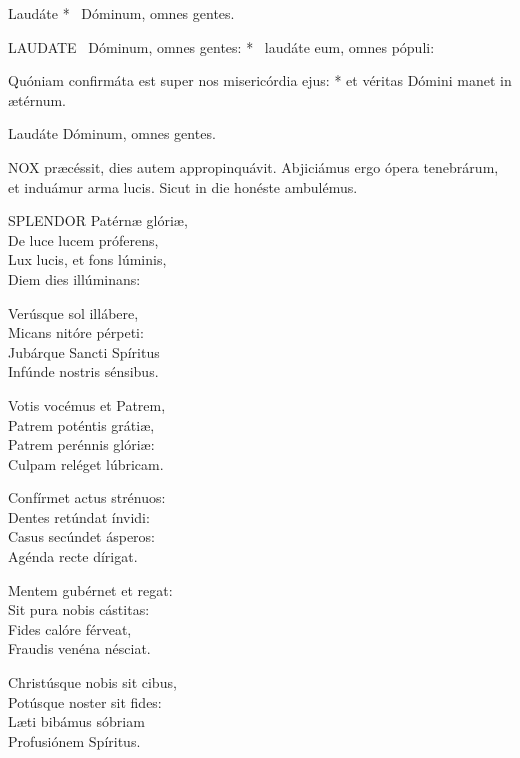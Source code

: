  Laudáte * \textdagger\ Dóminum, omnes gentes. \textdaggerdbl


\lettrine[lines=2]{L}{AUDATE} \textdagger\ Dóminum, omnes gentes: * \textdaggerdbl\ laudáte eum, omnes pópuli:

Quóniam confirmáta est super nos misericórdia ejus: * et véritas Dómini manet in ætérnum.

 Laudáte Dóminum, omnes gentes.




\lettrine[lines=2]{N}{OX} præcéssit, dies autem appropinquávit. Abjiciámus ergo ópera tenebrárum, et induámur arma lucis. Sicut in die honéste ambulémus.


\lettrine[lines=2]{S}{PLENDOR} Patérnæ glóriæ,\\
De luce lucem próferens,\\
Lux lucis, et fons lúminis,\\
Diem dies illúminans:

Verúsque sol illábere,\\
Micans nitóre pérpeti:\\
Jubárque Sancti Spíritus\\
Infúnde nostris sénsibus.

Votis vocémus et Patrem,\\
Patrem poténtis grátiæ,\\
Patrem perénnis glóriæ:\\
Culpam reléget lúbricam.

Confírmet actus strénuos:\\
Dentes retúndat ínvidi:\\
Casus secúndet ásperos:\\
Agénda recte dírigat.

Mentem gubérnet et regat:\\
Sit pura nobis cástitas:\\
Fides calóre férveat,\\
Fraudis venéna nésciat.

Christúsque nobis sit cibus,\\
Potúsque noster sit fides:\\
Læti bibámus sóbriam\\
Profusiónem Spíritus.

